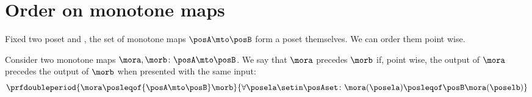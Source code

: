 \section{Order on monotone maps}

Fixed two poset \posA and \posB, the set of monotone maps $\posA \mto \posB$ form a poset themselves.
We can order them point wise.

\begin{definition}
    \label{def:order-monotone-maps}
    Consider two monotone maps $\mora,\morb\colon\posA\mto\posB$.
    We say that $\mora$ precedes $\morb$ if, point wise, the output of $\mora$ precedes the output of $\morb$ when presented with the same input:
    \begin{equation}
        \prfdoubleperiod{
            \mora \posleqof{\posA\mto\posB} \morb
        }{
            \forall \posela\setin\posAset \colon \mora(\posela) \posleqof\posB \mora(\poselb)
        }
    \end{equation}
\end{definition}


